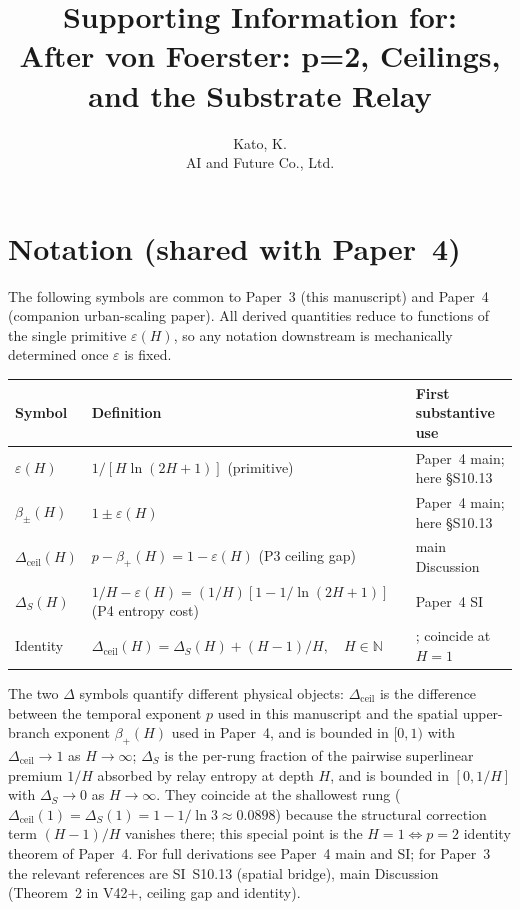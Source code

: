 \documentclass[11pt]{article}
\title{Supporting Information for:\\[0.5em] \textbf{After von Foerster: p=2, Ceilings, and the Substrate Relay}}
\author{Kato, K.\\AI and Future Co., Ltd.}
\date{}
\begin{document}
\maketitle

\tableofcontents

\pagebreak

\section*{Notation (shared with Paper~4)}
\label{sec:notation_shared}

The following symbols are common to Paper~3 (this manuscript) and Paper~4
(companion urban-scaling paper).  All derived quantities reduce to functions
of the single primitive $\varepsilon(H)$, so any notation downstream is
mechanically determined once $\varepsilon$ is fixed.

\begin{table}[H]
\centering
\small
\begin{tabular}{lll}
\toprule
Symbol & Definition & First substantive use \\
\midrule
$\varepsilon(H)$ & $1/[H\ln(2H+1)]$ \quad (primitive) & Paper~4 main; here \S S10.13 \\
$\beta_{\pm}(H)$ & $1\pm\varepsilon(H)$ & Paper~4 main; here \S S10.13 \\
$\Delta_{\mathrm{ceil}}(H)$ & $p-\beta_+(H)=1-\varepsilon(H)$ \quad (P3 ceiling gap) & main Discussion \\
$\Delta_{S}(H)$ & $1/H-\varepsilon(H)=(1/H)[1-1/\ln(2H+1)]$ \quad (P4 entropy cost) & Paper~4 SI \\
\addlinespace
Identity & $\Delta_{\mathrm{ceil}}(H)=\Delta_{S}(H)+(H-1)/H,\quad H\in\mathbb{N}$ & ; coincide at $H{=}1$ \\
\bottomrule
\end{tabular}
\end{table}

\noindent
The two $\Delta$ symbols quantify different physical objects: $\Delta_{\mathrm{ceil}}$
is the difference between the temporal exponent $p$ used in this manuscript and
the spatial upper-branch exponent $\beta_+(H)$ used in Paper~4, and is bounded
in $[0,1)$ with $\Delta_{\mathrm{ceil}}\to 1$ as $H\to\infty$; $\Delta_{S}$ is the
per-rung fraction of the pairwise superlinear premium $1/H$ absorbed by relay
entropy at depth $H$, and is bounded in $[0,1/H]$ with $\Delta_{S}\to 0$ as
$H\to\infty$.  They coincide at the shallowest rung
($\Delta_{\mathrm{ceil}}(1)=\Delta_{S}(1)=1-1/\ln 3\approx 0.0898$) because the
structural correction term $(H-1)/H$ vanishes there; this special point is the
$H{=}1\!\Leftrightarrow\!p{=}2$ identity theorem of Paper~4.  For full derivations
see Paper~4 main and SI; for Paper~3 the relevant references are SI~S10.13
(spatial bridge), main Discussion (Theorem~2 in V42$+$, ceiling gap and identity).
\end{document}
